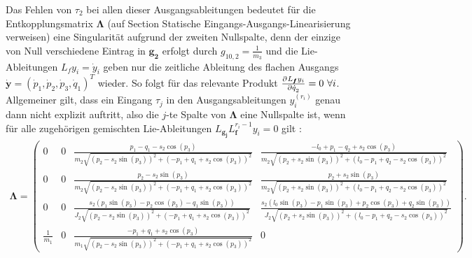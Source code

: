 Das Fehlen von $\tau_2$ bei allen dieser Ausgangsableitungen bedeutet für die Entkopplungsmatrix $\pmb{\Lambda}$ (auf Section Statische Eingangs-Ausgangs-Linearisierung verweisen) eine Singularität aufgrund der zweiten Nullspalte, denn der einzige von Null verschiedene Eintrag in $\pmb{g_2}$ erfolgt durch $g_{10, 2} = \frac{1}{m_3}$ und die Lie-Ableitungen $L_f y_i = \dot{y}_i$ geben nur die zeitliche Ableitung des flachen Ausgangs $\dot{\pmb{y}} = (\dot{p}_1, \dot{p}_2, \dot{p}_3, \dot{q}_1)^T$ wieder. So folgt für das relevante Produkt $\frac{\partial^{}L_{\pmb{f}} y_i}{\partial{\dot{q}_2}^{}} = 0 \ \forall i$. Allgemeiner gilt, dass ein Eingang $\tau_j$ in den Ausgangsableitungen $y_i^{(r_i)}$ genau dann nicht explizit auftritt, also die $j$-te Spalte von $\pmb{\Lambda}$ eine Nullspalte ist, wenn für alle zugehörigen gemischten Lie-Ableitungen $L_{\pmb{g_j}} L_{\pmb{f}}^{r_i-1} y_i = 0$ gilt \cite[S. 201]{NLRT_Roebenack}:
\begin{align}
	\pmb{\Lambda} = 
	\left(\begin{matrix}
		0 & 0 & \frac{p_{1} - q_{1} - s_{2} \cos{\left(p_{3} \right)}}{m_{2} \sqrt{\left(p_{2} - s_{2} \sin{\left(p_{3} \right)}\right)^{2} + \left(- p_{1} + q_{1} + s_{2} \cos{\left(p_{3} \right)}\right)^{2}}} & \frac{- l_{0} + p_{1} - q_{2} + s_{2} \cos{\left(p_{3} \right)}}{m_{2} \sqrt{\left(p_{2} + s_{2} \sin{\left(p_{3} \right)}\right)^{2} + \left(l_{0} - p_{1} + q_{2} - s_{2} \cos{\left(p_{3} \right)}\right)^{2}}}\\
		0 & 0 & \frac{p_{2} - s_{2} \sin{\left(p_{3} \right)}}{m_{2} \sqrt{\left(p_{2} - s_{2} \sin{\left(p_{3} \right)}\right)^{2} + \left(- p_{1} + q_{1} + s_{2} \cos{\left(p_{3} \right)}\right)^{2}}} & \frac{p_{2} + s_{2} \sin{\left(p_{3} \right)}}{m_{2} \sqrt{\left(p_{2} + s_{2} \sin{\left(p_{3} \right)}\right)^{2} + \left(l_{0} - p_{1} + q_{2} - s_{2} \cos{\left(p_{3} \right)}\right)^{2}}}\\
		0 & 0 & \frac{s_{2} \left(p_{1} \sin{\left(p_{3} \right)} - p_{2} \cos{\left(p_{3} \right)} - q_{1} \sin{\left(p_{3} \right)}\right)}{J_{2} \sqrt{\left(p_{2} - s_{2} \sin{\left(p_{3} \right)}\right)^{2} + \left(- p_{1} + q_{1} + s_{2} \cos{\left(p_{3} \right)}\right)^{2}}} & \frac{s_{2} \left(l_{0} \sin{\left(p_{3} \right)} - p_{1} \sin{\left(p_{3} \right)} + p_{2} \cos{\left(p_{3} \right)} + q_{2} \sin{\left(p_{3} \right)}\right)}{J_{2} \sqrt{\left(p_{2} + s_{2} \sin{\left(p_{3} \right)}\right)^{2} + \left(l_{0} - p_{1} + q_{2} - s_{2} \cos{\left(p_{3} \right)}\right)^{2}}}\\
		\frac{1}{m_{1}} & 0 & \frac{- p_{1} + q_{1} + s_{2} \cos{\left(p_{3} \right)}}{m_{1} \sqrt{\left(p_{2} - s_{2} \sin{\left(p_{3} \right)}\right)^{2} + \left(- p_{1} + q_{1} + s_{2} \cos{\left(p_{3} \right)}\right)^{2}}} & 0
	\end{matrix}\right) .
\end{align}

